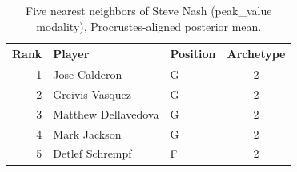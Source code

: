 \begin{table}[htbp]
  \centering\small
  \begin{tabular}{rllc}
    \toprule
    Rank & Player & Position & Archetype \\
    \midrule
    1 & Jose Calderon & G & 2 \\
    2 & Greivis Vasquez & G & 2 \\
    3 & Matthew Dellavedova & G & 2 \\
    4 & Mark Jackson & G & 2 \\
    5 & Detlef Schrempf & F & 2 \\
    \bottomrule
  \end{tabular}
  \caption{Five nearest neighbors of Steve Nash (peak_value modality), Procrustes-aligned posterior mean.}
  \label{tab:Steve_Nash_neighbors_peak_value}
\end{table}

